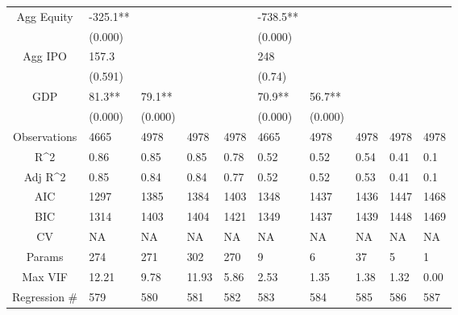 \documentclass{article}
\begin{document}
\begin{table}[H]
\begin{tabular}{|clllllllll|}
  Agg Equity & -325.1** &  &  &  & -738.5** &  &  &  &  \\ 
   & (0.000) &  &  &  & (0.000) &  &  &  &  \\ 
  Agg IPO & 157.3 &  &  &  & 248 &  &  &  &  \\ 
   & (0.591) &  &  &  & (0.74) &  &  &  &  \\ 
  GDP & 81.3** & 79.1** &  &  & 70.9** & 56.7** &  &  &  \\ 
   & (0.000) & (0.000) &  &  & (0.000) & (0.000) &  &  &  \\ 
  \hline 
 Observations & 4665 & 4978 & 4978 & 4978 & 4665 & 4978 & 4978 & 4978 & 4978 \\ 
  R^2 & 0.86 & 0.85 & 0.85 & 0.78 & 0.52 & 0.52 & 0.54 & 0.41 & 0.1 \\ 
  Adj R^2 & 0.85 & 0.84 & 0.84 & 0.77 & 0.52 & 0.52 & 0.53 & 0.41 & 0.1 \\ 
  AIC & 1297 & 1385 & 1384 & 1403 & 1348 & 1437 & 1436 & 1447 & 1468 \\ 
  BIC & 1314 & 1403 & 1404 & 1421 & 1349 & 1437 & 1439 & 1448 & 1469 \\ 
  CV & NA & NA & NA & NA & NA & NA & NA & NA & NA \\ 
  Params & 274 & 271 & 302 & 270 & 9 & 6 & 37 & 5 & 1 \\ 
  Max VIF & 12.21 & 9.78 & 11.93 & 5.86 & 2.53 & 1.35 & 1.38 & 1.32 & 0.00 \\ 
  Regression \# & 579 & 580 & 581 & 582 & 583 & 584 & 585 & 586 & 587 \\ 
   \hline
\end{tabular}
 
\end{table}
\end{document}
